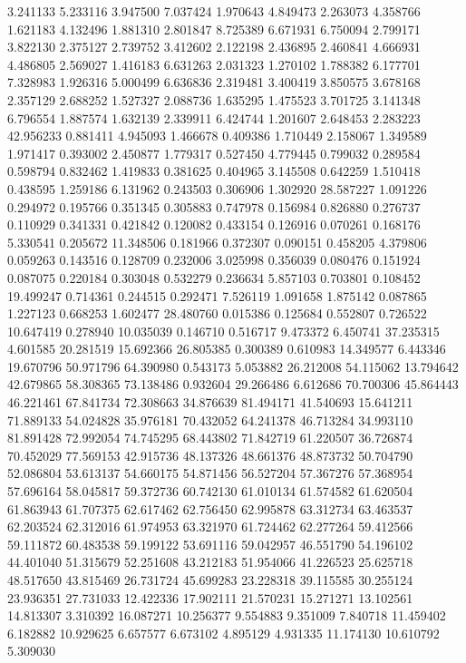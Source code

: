 3.241133
5.233116
3.947500
7.037424
1.970643
4.849473
2.263073
4.358766
1.621183
4.132496
1.881310
2.801847
8.725389
6.671931
6.750094
2.799171
3.822130
2.375127
2.739752
3.412602
2.122198
2.436895
2.460841
4.666931
4.486805
2.569027
1.416183
6.631263
2.031323
1.270102
1.788382
6.177701
7.328983
1.926316
5.000499
6.636836
2.319481
3.400419
3.850575
3.678168
2.357129
2.688252
1.527327
2.088736
1.635295
1.475523
3.701725
3.141348
6.796554
1.887574
1.632139
2.339911
6.424744
1.201607
2.648453
2.283223
42.956233
0.881411
4.945093
1.466678
0.409386
1.710449
2.158067
1.349589
1.971417
0.393002
2.450877
1.779317
0.527450
4.779445
0.799032
0.289584
0.598794
0.832462
1.419833
0.381625
0.404965
3.145508
0.642259
1.510418
0.438595
1.259186
6.131962
0.243503
0.306906
1.302920
28.587227
1.091226
0.294972
0.195766
0.351345
0.305883
0.747978
0.156984
0.826880
0.276737
0.110929
0.341331
0.421842
0.120082
0.433154
0.126916
0.070261
0.168176
5.330541
0.205672
11.348506
0.181966
0.372307
0.090151
0.458205
4.379806
0.059263
0.143516
0.128709
0.232006
3.025998
0.356039
0.080476
0.151924
0.087075
0.220184
0.303048
0.532279
0.236634
5.857103
0.703801
0.108452
19.499247
0.714361
0.244515
0.292471
7.526119
1.091658
1.875142
0.087865
1.227123
0.668253
1.602477
28.480760
0.015386
0.125684
0.552807
0.726522
10.647419
0.278940
10.035039
0.146710
0.516717
9.473372
6.450741
37.235315
4.601585
20.281519
15.692366
26.805385
0.300389
0.610983
14.349577
6.443346
19.670796
50.971796
64.390980
0.543173
5.053882
26.212008
54.115062
13.794642
42.679865
58.308365
73.138486
0.932604
29.266486
6.612686
70.700306
45.864443
46.221461
67.841734
72.308663
34.876639
81.494171
41.540693
15.641211
71.889133
54.024828
35.976181
70.432052
64.241378
46.713284
34.993110
81.891428
72.992054
74.745295
68.443802
71.842719
61.220507
36.726874
70.452029
77.569153
42.915736
48.137326
48.661376
48.873732
50.704790
52.086804
53.613137
54.660175
54.871456
56.527204
57.367276
57.368954
57.696164
58.045817
59.372736
60.742130
61.010134
61.574582
61.620504
61.863943
61.707375
62.617462
62.756450
62.995878
63.312734
63.463537
62.203524
62.312016
61.974953
63.321970
61.724462
62.277264
59.412566
59.111872
60.483538
59.199122
53.691116
59.042957
46.551790
54.196102
44.401040
51.315679
52.251608
43.212183
51.954066
41.226523
25.625718
48.517650
43.815469
26.731724
45.699283
23.228318
39.115585
30.255124
23.936351
27.731033
12.422336
17.902111
21.570231
15.271271
13.102561
14.813307
3.310392
16.087271
10.256377
9.554883
9.351009
7.840718
11.459402
6.182882
10.929625
6.657577
6.673102
4.895129
4.931335
11.174130
10.610792
5.309030
